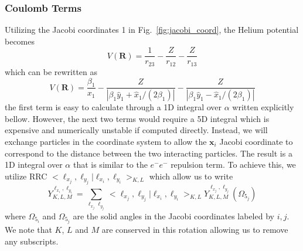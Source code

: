 


\subsubsection{Coulomb Terms}
Utilizing the Jacobi coordinates 1 in Fig.~\ref{fig:jacobi_coord}, the Helium potential becomes
\begin{equation}
    V(\mathbf{R}) = \frac{1}{r_{23}} - \frac{Z}{r_{12}} - \frac{Z}{r_{13}}
\end{equation}
which can be rewritten as 
\begin{equation}
    V(\mathbf{R}) = \frac{\beta_1}{x_1} - \frac{Z}{|\beta_1\hat{y}_1+\hat{x}_1/(2\beta_1)|} - \frac{Z}{|\beta_1\hat{y}_1-\hat{x}_1/(2\beta_1)|}
\end{equation}
the first term is easy to calculate through a 1D integral over $\alpha$ written explicitly bellow. However, the next two terms would require a 5D integral which is expensive and numerically unstable if computed directly. Instead, we will exchange particles in the coordinate system to allow the $\mathbf{x}_i$ Jacobi coordinate to correspond to the distance between the two interacting particles. The result is a 1D integral over $\alpha$ that is similar to the $e^-e^-$ repulsion term. To achieve this, we utilize RRC $<\ell_{x_j},\ell_{y_j}|\ell_{x_i},\ell_{y_i}>_{K,L}$ which allow us to write
\begin{equation}
    Y^{\ell_{x_i},\ell_{y_i}}_{K,L,M} = \sum\limits_{\ell_{x_j}\ell_{y_j}} <\ell_{x_j},\ell_{y_j}|\ell_{x_i},\ell_{y_i}>_{K,L} Y^{\ell_{x_j},\ell_{y_j}}_{K,L,M}(\Omega_{5_j})
\end{equation}
where $\Omega_{5_i}$ and $\Omega_{5_j}$ are the solid angles in the Jacobi coordinates labeled by $i,j$. We note that $K$, $L$ and $M$ are conserved in this rotation allowing us to remove any subscripts. 

